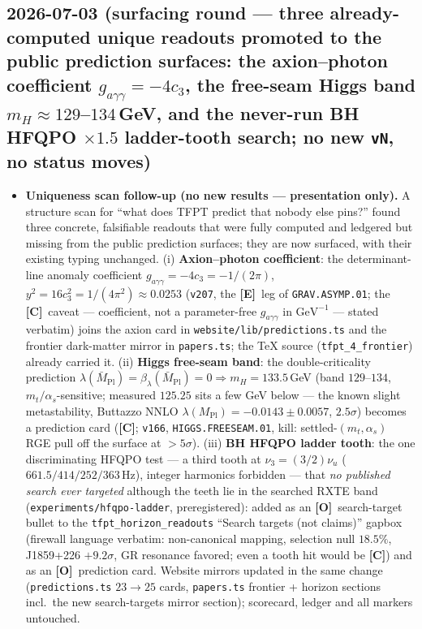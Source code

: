 \documentclass[11pt]{article}
\providecommand{\mE}{\textbf{[E]}}\providecommand{\mC}{\textbf{[C]}}
\providecommand{\mO}{\textbf{[O]}}\providecommand{\mX}{\textbf{[X]}}
\providecommand{\cthree}{c_3}\providecommand{\phiz}{\varphi_0^{\mathrm{ret}}}
\providecommand{\Mbar}{\bar M_{\mathrm{Pl}}}\providecommand{\Z}{\mathbb{Z}}\providecommand{\PP}{\mathbb{P}}
\begin{document}
\subsection*{2026-07-03 (surfacing round --- three already-computed unique readouts promoted to the public prediction surfaces: the axion--photon coefficient $g_{a\gamma\gamma}=-4\cthree$, the free-seam Higgs band $m_H\approx129$--$134$\,GeV, and the never-run BH HFQPO $\times1.5$ ladder-tooth search; no new \texttt{vN}, no status moves)}
\begin{itemize}[leftmargin=1.5em]
\item \textbf{Uniqueness scan follow-up (no new results --- presentation only).} A structure scan for
``what does TFPT predict that nobody else pins?'' found three concrete, falsifiable readouts that were
fully computed and ledgered but missing from the public prediction surfaces; they are now surfaced,
with their existing typing unchanged. (i) \textbf{Axion--photon coefficient}: the determinant-line
anomaly coefficient $g_{a\gamma\gamma}=-4\cthree=-1/(2\pi)$, $y^2=16\cthree^2=1/(4\pi^2)\approx0.0253$
(\texttt{v207}, the \mE\ leg of \texttt{GRAV.ASYMP.01}; the \mC\ caveat --- coefficient, not a
parameter-free $g_{a\gamma\gamma}$ in $\mathrm{GeV}^{-1}$ --- stated verbatim) joins the axion card in
\texttt{website/lib/predictions.ts} and the frontier dark-matter mirror in \texttt{papers.ts}; the TeX
source (\texttt{tfpt\_4\_frontier}) already carried it. (ii) \textbf{Higgs free-seam band}: the
double-criticality prediction $\lambda(\Mbar)=\beta_\lambda(\Mbar)=0\Rightarrow m_H=133.5$\,GeV (band
$129$--$134$, $m_t/\alpha_s$-sensitive; measured $125.25$ sits a few GeV below --- the known slight
metastability, Buttazzo NNLO $\lambda(M_{\mathrm{Pl}})=-0.0143\pm0.0057$, $2.5\sigma$) becomes a
prediction card (\mC; \texttt{v166}, \texttt{HIGGS.FREESEAM.01}, kill: settled-$(m_t,\alpha_s)$ RGE pull
off the surface at $>5\sigma$). (iii) \textbf{BH HFQPO ladder tooth}: the one discriminating HFQPO test
--- a third tooth at $\nu_3=(3/2)\nu_u$ ($661.5/414/252/363$\,Hz), integer harmonics forbidden --- that
\emph{no published search ever targeted} although the teeth lie in the searched RXTE band
(\texttt{experiments/hfqpo-ladder}, preregistered): added as an \mO\ search-target bullet to the
\texttt{tfpt\_horizon\_readouts} ``Search targets (not claims)'' gapbox (firewall language verbatim:
non-canonical mapping, selection null $18.5\%$, J1859+226 $+9.2\sigma$, GR resonance favored; even a
tooth hit would be \mC) and as an \mO\ prediction card. Website mirrors updated in the same change
(\texttt{predictions.ts} $23\to25$ cards, \texttt{papers.ts} frontier + horizon sections incl.\ the new
search-targets mirror section); scorecard, ledger and all markers untouched.
\end{itemize}
\end{document}
